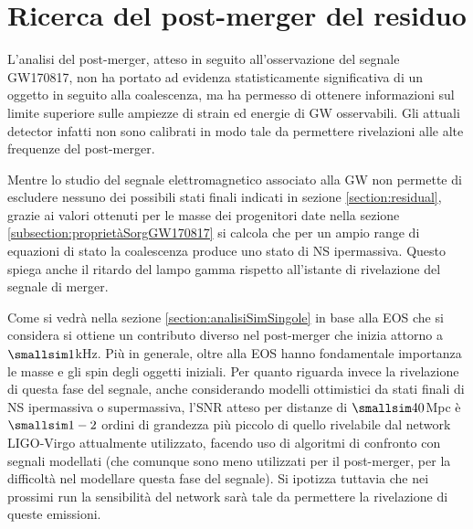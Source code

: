 \section{Ricerca del post-merger del residuo}
\label{section:postmergerGW170817}
L'analisi del post-merger, atteso in seguito all'osservazione del segnale GW170817, non ha portato ad evidenza statisticamente significativa di un oggetto in seguito alla coalescenza, ma ha permesso di ottenere informazioni sul limite superiore sulle ampiezze di strain ed energie di GW osservabili. Gli attuali detector infatti non sono calibrati in modo tale da permettere rivelazioni alle alte frequenze del post-merger.

Mentre lo studio del segnale elettromagnetico associato alla GW non permette di escludere nessuno dei possibili stati finali indicati in sezione \ref{section:residual}, grazie ai valori ottenuti per le masse dei progenitori date nella sezione \ref{subsection:proprietàSorgGW170817} si calcola che per un ampio range di equazioni di stato la coalescenza produce uno stato di NS ipermassiva. Questo spiega anche il ritardo del lampo gamma rispetto all'istante di rivelazione del segnale di merger. 

Come si vedrà nella sezione \ref{section:analisiSimSingole} in base alla EOS che si considera si ottiene un contributo diverso nel post-merger che inizia attorno a $\smallsim1$kHz. Più in generale, oltre alla EOS hanno fondamentale importanza le masse e gli spin degli oggetti iniziali. 
Per quanto riguarda invece la rivelazione di questa fase del segnale, anche considerando modelli ottimistici da stati finali di NS ipermassiva o supermassiva, l'SNR atteso per distanze di $\smallsim40$Mpc è $\smallsim1-2$ ordini di grandezza più piccolo di quello rivelabile dal network LIGO-Virgo attualmente utilizzato, facendo uso di algoritmi di confronto con segnali modellati (che comunque sono meno utilizzati per il post-merger, per la difficoltà nel modellare questa fase del segnale).
Si ipotizza tuttavia che nei prossimi run la sensibilità del network sarà tale da permettere la rivelazione di queste emissioni\cite{Abbott_2017b}.

